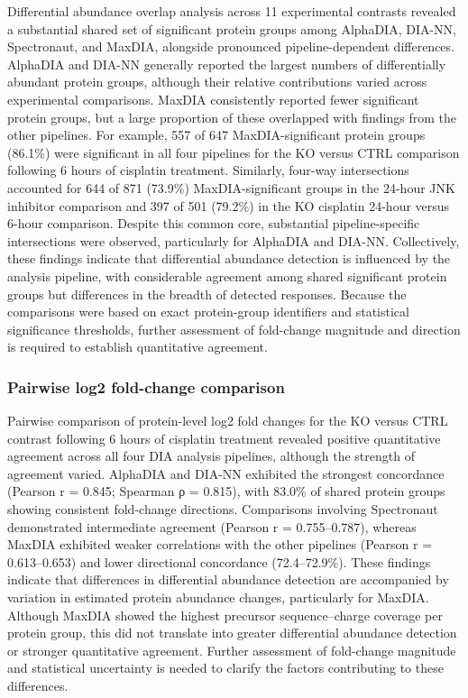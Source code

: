 \documentclass[
  10pt,
]{article}
\begin{document}
Differential abundance overlap analysis across 11 experimental contrasts
revealed a substantial shared set of significant protein groups among
AlphaDIA, DIA-NN, Spectronaut, and MaxDIA, alongside pronounced
pipeline-dependent differences. AlphaDIA and DIA-NN generally reported
the largest numbers of differentially abundant protein groups, although
their relative contributions varied across experimental comparisons.
MaxDIA consistently reported fewer significant protein groups, but a
large proportion of these overlapped with findings from the other
pipelines. For example, 557 of 647 MaxDIA-significant protein groups
(86.1\%) were significant in all four pipelines for the KO versus CTRL
comparison following 6 hours of cisplatin treatment. Similarly, four-way
intersections accounted for 644 of 871 (73.9\%) MaxDIA-significant
groups in the 24-hour JNK inhibitor comparison and 397 of 501 (79.2\%)
in the KO cisplatin 24-hour versus 6-hour comparison. Despite this
common core, substantial pipeline-specific intersections were observed,
particularly for AlphaDIA and DIA-NN. Collectively, these findings
indicate that differential abundance detection is influenced by the
analysis pipeline, with considerable agreement among shared significant
protein groups but differences in the breadth of detected responses.
Because the comparisons were based on exact protein-group identifiers
and statistical significance thresholds, further assessment of
fold-change magnitude and direction is required to establish
quantitative agreement.

\subsubsection{Pairwise log2 fold-change
comparison}\label{pairwise-log2-fold-change-comparison}

Pairwise comparison of protein-level log2 fold changes for the KO versus
CTRL contrast following 6 hours of cisplatin treatment revealed positive
quantitative agreement across all four DIA analysis pipelines, although
the strength of agreement varied. AlphaDIA and DIA-NN exhibited the
strongest concordance (Pearson r = 0.845; Spearman ρ = 0.815), with
83.0\% of shared protein groups showing consistent fold-change
directions. Comparisons involving Spectronaut demonstrated intermediate
agreement (Pearson r = 0.755--0.787), whereas MaxDIA exhibited weaker
correlations with the other pipelines (Pearson r = 0.613--0.653) and
lower directional concordance (72.4--72.9\%). These findings indicate
that differences in differential abundance detection are accompanied by
variation in estimated protein abundance changes, particularly for
MaxDIA. Although MaxDIA showed the highest precursor sequence--charge
coverage per protein group, this did not translate into greater
differential abundance detection or stronger quantitative agreement.
Further assessment of fold-change magnitude and statistical uncertainty
is needed to clarify the factors contributing to these differences.
\end{document}
